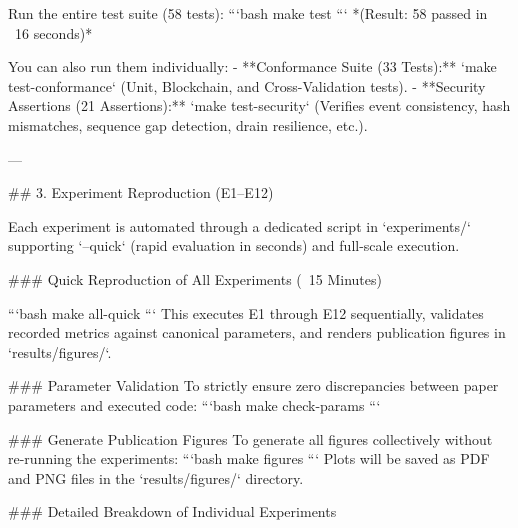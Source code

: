 Run the entire test suite (58 tests):
```bash
make test
```
*(Result: 58 passed in ~16 seconds)*

You can also run them individually:
- **Conformance Suite (33 Tests):** `make test-conformance` (Unit, Blockchain, and Cross-Validation tests).
- **Security Assertions (21 Assertions):** `make test-security` (Verifies event consistency, hash mismatches, sequence gap detection, drain resilience, etc.).

---

## 3. Experiment Reproduction (E1–E12)

Each experiment is automated through a dedicated script in `experiments/` supporting `--quick` (rapid evaluation in seconds) and full-scale execution.

### Quick Reproduction of All Experiments (~15 Minutes)

```bash
make all-quick
```
This executes E1 through E12 sequentially, validates recorded metrics against canonical parameters, and renders publication figures in `results/figures/`.

### Parameter Validation
To strictly ensure zero discrepancies between paper parameters and executed code:
```bash
make check-params
```

### Generate Publication Figures
To generate all figures collectively without re-running the experiments:
```bash
make figures
```
Plots will be saved as PDF and PNG files in the `results/figures/` directory.

### Detailed Breakdown of Individual Experiments

